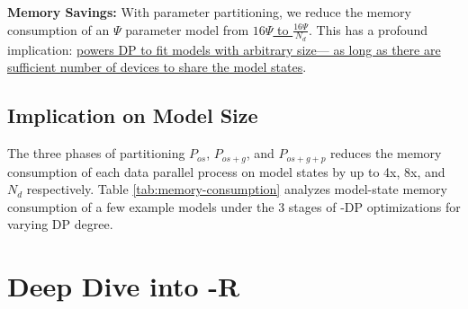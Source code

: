 \textbf{Memory Savings:} With parameter partitioning, we reduce the memory consumption of an $\Psi$ parameter model from \uline{$16\Psi$ to $\frac{16\Psi}{N_d}$}.  This has a profound implication: \uline{\name powers DP to fit models with arbitrary size— as long as there are sufficient number of devices to share the model states}.

\subsection{Implication on Model Size}\label{sec:summarymemoryoptimization}

The three phases of partitioning $P_{os}$, $P_{os+g}$, and $P_{os+g+p}$ reduces the memory consumption of each data parallel process on model states by up to 4x, 8x, and $N_d$ respectively.
Table \ref{tab:memory-consumption} analyzes model-state memory consumption of a few example models under the 3 stages of \name-DP optimizations for varying DP degree.
  

\section{Deep Dive into \name-R}
